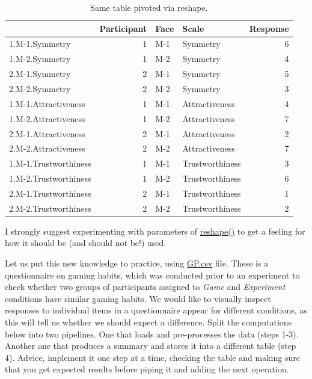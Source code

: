\documentclass[
]{book}
\begin{document}
\begin{table}

\caption{\label{tab:unnamed-chunk-212}Same table pivoted via reshape.}
\centering
\begin{tabular}[t]{l|r|l|l|r}
\hline
  & Participant & Face & Scale & Response\\
\hline
1.M-1.Symmetry & 1 & M-1 & Symmetry & 6\\
\hline
1.M-2.Symmetry & 1 & M-2 & Symmetry & 4\\
\hline
2.M-1.Symmetry & 2 & M-1 & Symmetry & 5\\
\hline
2.M-2.Symmetry & 2 & M-2 & Symmetry & 3\\
\hline
1.M-1.Attractiveness & 1 & M-1 & Attractiveness & 4\\
\hline
1.M-2.Attractiveness & 1 & M-2 & Attractiveness & 7\\
\hline
2.M-1.Attractiveness & 2 & M-1 & Attractiveness & 2\\
\hline
2.M-2.Attractiveness & 2 & M-2 & Attractiveness & 7\\
\hline
1.M-1.Trustworthiness & 1 & M-1 & Trustworthiness & 3\\
\hline
1.M-2.Trustworthiness & 1 & M-2 & Trustworthiness & 6\\
\hline
2.M-1.Trustworthiness & 2 & M-1 & Trustworthiness & 1\\
\hline
2.M-2.Trustworthiness & 2 & M-2 & Trustworthiness & 2\\
\hline
\end{tabular}
\end{table}

I strongly suggest experimenting with parameters of \href{https://stat.ethz.ch/R-manual/R-patched/library/stats/html/reshape.html}{reshape()} to get a feeling for how it should be (and should not be!) used.

Let us put this new knowledge to practice, using \href{data/GP.csv}{GP.csv} file. These is a questionnaire on gaming habits, which was conducted prior to an experiment to check whether two groups of participants assigned to \emph{Game} and \emph{Experiment} conditions have similar gaming habits. We would like to visually inspect responses to individual items in a questionnaire appear for different conditions, as this will tell us whether we should expect a difference. Split the computations below into two pipelines. One that loads and pre-processes the data (steps 1-3). Another one that produces a summary and stores it into a different table (step 4). Advice, implement it one step at a time, checking the table and making sure that you get expected results before piping it and adding the next operation.
\end{document}
